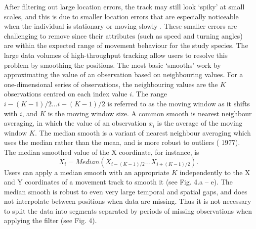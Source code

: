 \begin{refsection}
    After filtering out large location errors, the track may still look `spiky’ at small scales, and this is due to smaller location errors that are especially noticeable when the individual is stationary or moving slowly \citep{noonan2019}.
    These smaller errors are challenging to remove since their attributes (such as speed and turning angles) are within the expected range of movement behaviour for the study species. 
    The large data volumes of high-throughput tracking allow users to resolve this problem by smoothing the positions. 
    The most basic `smooths' work by approximating the value of an observation based on neighbouring values.
    For a one-dimensional series of observations, the neighbouring values are the $K$ observations centred on each index value $i$.
    The range ${i - (K-1)/2} \ldots {i + (K-1)/2}$ is referred to as the moving window as it shifts with $i$, and $K$ is the moving window size.
    A common smooth is nearest neighbour averaging, in which the value of an observation $x_i$ is the average of the moving window $K$.
    The median smooth is a variant of nearest neighbour averaging which uses the median rather than the mean, and is more robust to outliers (\citeauthor{tukey1977} 1977).
    The median smoothed value of the X coordinate, for instance, is
        $$
            X_i = Median(X_{i - (K-1)/2} \ldots X_{i + (K-1)/2}).
        $$
    Users can apply a median smooth with an appropriate $K$ independently to the X and Y coordinates of a movement track to smooth it (see Fig. 4.a -- e).
    The median smooth is robust to even very large temporal and spatial gaps, and does not interpolate between positions when data are missing. 
    Thus it is not necessary to split the data into segments separated by periods of missing observations when applying the filter (see Fig. 4).


\end{refsection}

